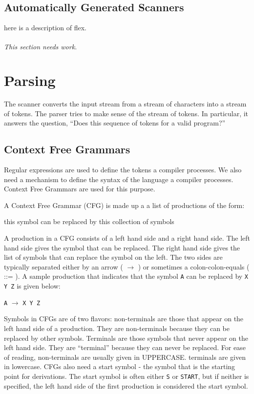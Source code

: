 \documentclass[letterpaper,12pt,openany,reqno]{book}%
\newcommand{\code}[1] {\lstinline[breaklines=yes,breakatwhitespace=yes]{#1}}
\newcommand{\cfgprod}[2] {\texttt{#1} $\rightarrow$ \texttt{#2}}
\newcommand{\needswork}{\paragraph{This section needs work.}}
\begin{document}
\chapter{Automatically Generated Scanners}
here is a description of flex.
\needswork{}

\part{Parsing} \label{part.parser}
The scanner converts the input stream from a stream of characters into a stream of tokens. The parser tries to make sense of the stream of tokens. In particular, it answers the question, ``Does this sequence of tokens for a valid program?''

\chapter{Context Free Grammars}
Regular expressions are used to define the tokens a compiler processes. We also need a mechanism to define the syntax of the language a compiler processes. Context Free Grammars are used for this purpose.

A Context Free Grammar (CFG) is made up a a list of productions of the form:

\indent this symbol can be replaced by this collection of symbols

A production in a CFG consists of a left hand side and a right hand side. The left hand side gives the symbol that can be replaced. The right hand side gives the list of symbols that can replace the symbol on the left. The two sides are typically separated 
either by an arrow ( $\rightarrow$ ) 
or sometimes a colon-colon-equals ( ::= ). 
A sample production that indicates that the symbol \code{A} 
can be replaced by \code{X Y Z} is given below:

\cfgprod{A}{X Y Z}

Symbols in CFGs are of two flavors: non-terminals are those that appear on the left hand side of a production. They are non-terminals because they can be replaced by other symbols. Terminals are those symbols that never appear on the left hand side. They are ``terminal'' because they can never be replaced. For ease of reading, non-terminals are usually given in UPPERCASE. terminals are given in lowercase. CFGs also need a start symbol - the symbol that is the starting point for derivations. The start symbol is often either \code{S} or \code{START}, but if neither is specified, the left hand side of the first production is considered the start symbol.
\end{document}
